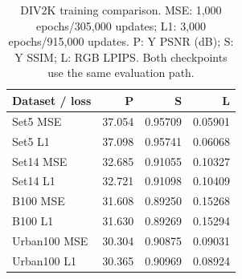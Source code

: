 \begin{table}[t]
\centering\small
\caption{DIV2K training comparison. MSE: 1,000 epochs/305,000 updates; L1: 3,000 epochs/915,000 updates. P: Y PSNR (dB); S: Y SSIM; L: RGB LPIPS. Both checkpoints use the same evaluation path.}
\label{tab:div2k-training}
\begin{tabular}{lrrr}
\toprule
Dataset / loss & P & S & L\\
\midrule
Set5 MSE &37.054&0.95709&0.05901\\
Set5 L1 &37.098&0.95741&0.06068\\
Set14 MSE &32.685&0.91055&0.10327\\
Set14 L1 &32.721&0.91098&0.10409\\
B100 MSE &31.608&0.89250&0.15268\\
B100 L1 &31.630&0.89269&0.15294\\
Urban100 MSE &30.304&0.90875&0.09031\\
Urban100 L1 &30.365&0.90969&0.08924\\
\bottomrule
\end{tabular}
\end{table}
